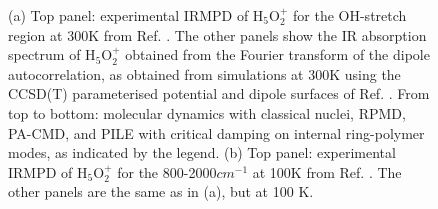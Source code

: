 \documentclass[aps,prb,superscriptaddress,amsmath,amssymb,showpacs,twocolumn]{revtex4}
\begin{document}
\begin{figure}[htbp]
\centering
{}
\caption{
(a) Top panel: experimental IRMPD of H$_5$O$_2^+$ for the OH-stretch region at 300K from Ref. \cite{YehLee1989}. The other panels show the IR absorption spectrum of H$_5$O$_2^+$ obtained from the Fourier transform of the dipole autocorrelation, as obtained from simulations at 300K using the CCSD(T) parameterised potential and dipole surfaces of Ref. \cite{HuangBraamsBowman2005}. From top to bottom:
 molecular dynamics with classical nuclei, RPMD, PA-CMD, and PILE with critical damping on internal ring-polymer modes, as indicated by the legend. (b) Top panel: experimental IRMPD of H$_5$O$_2^+$ for the 800-2000$cm^{-1}$ at 100K from Ref. \cite{AsmisScience2003}. The other panels are the same as in (a), but at 100 K.}
\label{fig:zundel-highf-lowf}
\end{figure}


\end{document}
